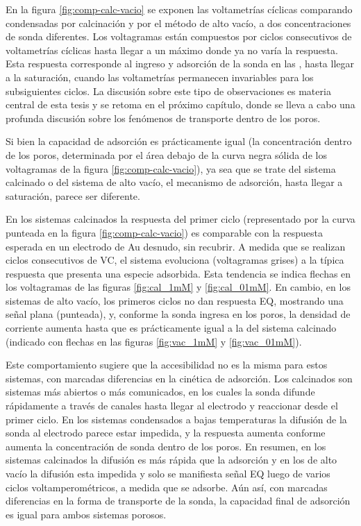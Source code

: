 	  En la figura \ref{fig:comp-calc-vacio} se exponen las voltametrías cíclicas comparando \pdmF\space condensadas por calcinación y por el método de alto vacío, a dos concentraciones de sonda diferentes. Los voltagramas están compuestos por ciclos consecutivos de voltametrías cíclicas hasta llegar a un máximo donde ya no varía la respuesta. Esta respuesta corresponde al ingreso y adsorción de la sonda en las \pdm, hasta llegar a la saturación, cuando las voltametrías permanecen invariables para los subsiguientes ciclos. La discusión sobre este tipo de observaciones  es materia central de esta tesis y se retoma en el próximo capítulo, donde se lleva a cabo una profunda discusión sobre los fenómenos de transporte dentro de los poros.

      Si bien la capacidad de adsorción es prácticamente igual (la concentración dentro de los poros, determinada por el área debajo de la curva negra sólida de los voltagramas de la figura \ref{fig:comp-calc-vacio}), ya sea que se trate del sistema calcinado o del sistema de alto vacío, el mecanismo de adsorción, hasta llegar a saturación, parece ser diferente. 

      En los sistemas calcinados la respuesta del primer ciclo (representado por la curva punteada en la figura \ref{fig:comp-calc-vacio}) es comparable con la respuesta esperada en un electrodo de Au desnudo, sin recubrir. A medida que se realizan ciclos consecutivos de VC, el sistema evoluciona (voltagramas grises) a la típica respuesta que presenta una especie adsorbida. Esta tendencia se indica flechas en los voltagramas de las figuras \ref{fig:cal_1mM} y \ref{fig:cal_01mM}. En cambio, en los sistemas de alto vacío, los primeros ciclos no dan respuesta EQ, mostrando una señal plana (punteada), y, conforme la sonda ingresa en los poros, la densidad de corriente aumenta hasta que es prácticamente igual a la del sistema calcinado (indicado con flechas en las figuras \ref{fig:vac_1mM} y \ref{fig:vac_01mM}). 

      Este comportamiento sugiere que la accesibilidad no es la misma para estos sistemas, con marcadas diferencias en la cinética de adsorción. Los calcinados son sistemas más abiertos o más comunicados, en los cuales la sonda difunde rápidamente a través de canales hasta llegar al electrodo y reaccionar desde el primer ciclo. En los sistemas condensados a bajas temperaturas la difusión de la sonda al electrodo parece estar impedida, y la respuesta aumenta conforme aumenta la concentración de sonda dentro de los poros. En resumen, en los sistemas calcinados la difusión es más rápida que la adsorción y en los de alto vacío la difusión esta impedida y solo se manifiesta señal EQ luego de varios ciclos voltamperométricos, a medida que se adsorbe. Aún así, con marcadas diferencias en la forma de transporte de la sonda, la capacidad final de adsorción es igual para ambos sistemas porosos.

